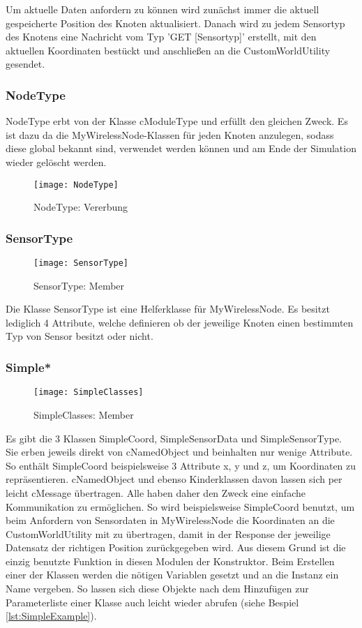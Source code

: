 Um aktuelle Daten anfordern zu können wird zunächst immer die aktuell gespeicherte Position des Knoten aktualisiert. Danach wird zu jedem Sensortyp des Knotens eine Nachricht vom Typ 'GET [Sensortyp]' erstellt, mit den aktuellen Koordinaten bestückt und anschließen an die CustomWorldUtility gesendet.

\subsubsection{NodeType}

NodeType erbt von der Klasse cModuleType und erfüllt den gleichen Zweck. Es ist dazu da die MyWirelessNode-Klassen für jeden Knoten anzulegen, sodass diese global bekannt sind, verwendet werden können und am Ende der Simulation wieder gelöscht werden.

\begin{figure}[htbp]
\centering
\caption{NodeType: Vererbung}
\texttt{[image: NodeType]}
\end{figure}

\subsubsection{SensorType}

\begin{figure}[htbp]
\centering
\caption{SensorType: Member}
\texttt{[image: SensorType]}
\end{figure}

Die Klasse SensorType ist eine Helferklasse für MyWirelessNode. Es besitzt lediglich 4 Attribute, welche definieren ob der jeweilige Knoten einen bestimmten Typ von Sensor besitzt oder nicht.

\subsubsection{Simple*}

\begin{figure}[htbp]
\centering
\caption{SimpleClasses: Member}
\texttt{[image: SimpleClasses]}
\end{figure}

Es gibt die 3 Klassen SimpleCoord, SimpleSensorData und SimpleSensorType.  Sie erben jeweils direkt von cNamedObject und beinhalten nur wenige Attribute. So enthält SimpleCoord beispielsweise 3 Attribute x, y und z, um Koordinaten zu repräsentieren.\newline
cNamedObject und ebenso Kinderklassen davon lassen sich per leicht cMessage übertragen. Alle haben daher den Zweck eine einfache Kommunikation zu ermöglichen. So wird beispielsweise SimpleCoord benutzt, um beim Anfordern von Sensordaten in MyWirelessNode die Koordinaten an die CustomWorldUtility mit zu übertragen, damit in der Response der jeweilige Datensatz der richtigen Position zurückgegeben wird.\newline
Aus diesem Grund ist die einzig benutzte Funktion in diesen Modulen der Konstruktor. Beim Erstellen einer der Klassen werden die nötigen Variablen gesetzt und an die Instanz ein Name vergeben. So lassen sich diese Objekte nach dem Hinzufügen zur Parameterliste einer Klasse auch leicht wieder abrufen (siehe Bespiel \ref{lst:SimpleExample}).

